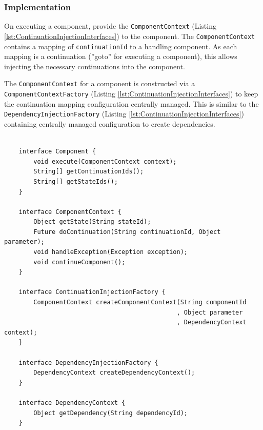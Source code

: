 \documentclass[prodmode]{style/acmlarge}
\begin{document}
\subsubsection*{Implementation}

On executing a component, provide the \texttt{ComponentContext} (Listing
\ref{lst:ContinuationInjectionInterfaces}) to the component.  The
\texttt{ComponentContext} contains a mapping of \texttt{continuationId} to a
handling component.  As each mapping is a continuation (''goto'' for executing a
component), this allows injecting the necessary continuations into the
component.

The \texttt{ComponentContext} for a component is constructed via a
\texttt{ComponentContextFactory} (Listing \ref{lst:ContinuationInjectionInterfaces})
to keep the continuation mapping configuration centrally managed.  This is
similar to the \texttt{DependencyInjectionFactory} (Listing
\ref{lst:ContinuationInjectionInterfaces}) containing centrally managed
configuration to create dependencies.

\begin{lstlisting}[float,label=lst:ContinuationInjectionInterfaces]

    interface Component {
        void execute(ComponentContext context);
        String[] getContinuationIds();
        String[] getStateIds();
    }

    interface ComponentContext {
        Object getState(String stateId);
        Future doContinuation(String continuationId, Object parameter);
        void handleException(Exception exception);
        void continueComponent();
    }
    
    interface ContinuationInjectionFactory {
        ComponentContext createComponentContext(String componentId
                                               , Object parameter
                                               , DependencyContext context);
    }
    
    interface DependencyInjectionFactory {
        DependencyContext createDependencyContext();
    }
    
    interface DependencyContext {
        Object getDependency(String dependencyId);
    }
\end{lstlisting}
\end{document}
